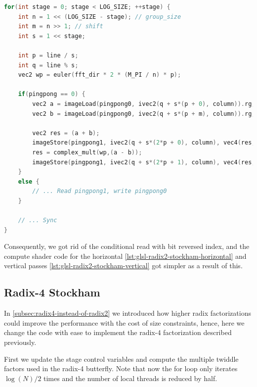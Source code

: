 \documentclass[
  oneside,
  11pt, a4paper,
  footinclude=true,
  headinclude=true,
  cleardoublepage=empty
]{scrbook}
\begin{document}
\begin{lstlisting}[language=C, caption={Radix-2 Stockham DIF}, label={lst:stockham-reordering}]
for(int stage = 0; stage < LOG_SIZE; ++stage) {
    int n = 1 << (LOG_SIZE - stage); // group_size
    int m = n >> 1; // shift
    int s = 1 << stage;

    int p = line / s;
    int q = line % s;
    vec2 wp = euler(fft_dir * 2 * (M_PI / n) * p);
    
    if(pingpong == 0) {
        vec2 a = imageLoad(pingpong0, ivec2(q + s*(p + 0), column)).rg;
        vec2 b = imageLoad(pingpong0, ivec2(q + s*(p + m), column)).rg;

        vec2 res = (a + b);
        imageStore(pingpong1, ivec2(q + s*(2*p + 0), column), vec4(res,0,0));
        res = complex_mult(wp,(a - b));
        imageStore(pingpong1, ivec2(q + s*(2*p + 1), column), vec4(res,0,0));
    }
    else {
        // ... Read pingpong1, write pingpong0
    }
    
    // ... Sync
}
\end{lstlisting}

Consequently, we got rid of the conditional read with bit reversed index, and the compute shader code for the horizontal \autoref{lst:glsl-radix2-stockham-horizontal} and vertical passes \autoref{lst:glsl-radix2-stockham-vertical} got simpler as a result of this.

\subsection{Radix-4 Stockham} \label{subsec:radix4-stockham}

In \autoref{subsec:radix4-instead-of-radix2} we introduced how higher radix factorizations could improve the performance with the cost of size constraints, hence, here we change the code with ease to implement the radix-4 factorization described previously.
\newline

First we update the stage control variables and compute the multiple twiddle factors used in the radix-4 butterfly. Note that now the for loop only iterates $\log{(N)}/2$ times and the number of local threads is reduced by half.
\end{document}
